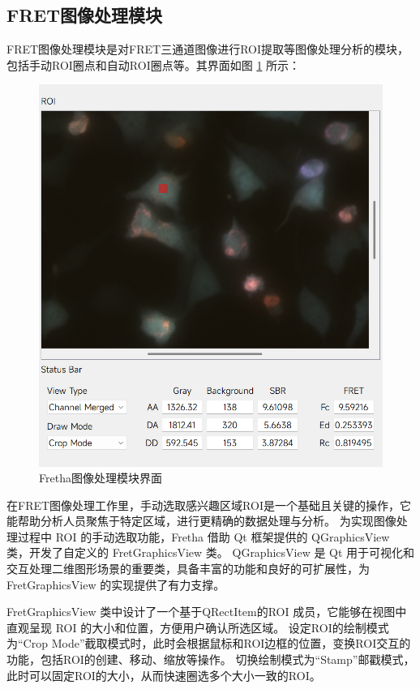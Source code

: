 \subsection{FRET图像处理模块}
\label{sec:FRET图像处理模块}
FRET图像处理模块是对FRET三通道图像进行ROI提取等图像处理分析的模块，包括手动ROI圈点和自动ROI圈点等。其界面如图 \ref{fig:fretha_imageprocess_ui} 所示：
\begin{figure}[htbp]
    \centering
    \includegraphics[width=0.75\linewidth]{../figures/2/2_图像处理模块界面.png}
    \caption{Fretha图像处理模块界面}
    \label{fig:fretha_imageprocess_ui}
\end{figure}
在FRET图像处理工作里，手动选取感兴趣区域ROI是一个基础且关键的操作，它能帮助分析人员聚焦于特定区域，进行更精确的数据处理与分析。
为实现图像处理过程中 ROI 的手动选取功能，Fretha 借助 Qt 框架提供的 QGraphicsView 类，开发了自定义的 FretGraphicsView 类。
QGraphicsView 是 Qt 用于可视化和交互处理二维图形场景的重要类，具备丰富的功能和良好的可扩展性，为 FretGraphicsView 的实现提供了有力支撑。

FretGraphicsView 类中设计了一个基于QRectItem的ROI 成员，它能够在视图中直观呈现 ROI 的大小和位置，方便用户确认所选区域。
设定ROI的绘制模式为“Crop Mode”截取模式时，此时会根据鼠标和ROI边框的位置，变换ROI交互的功能，包括ROI的创建、移动、缩放等操作。
切换绘制模式为“Stamp”邮戳模式，此时可以固定ROI的大小，从而快速圈选多个大小一致的ROI。

